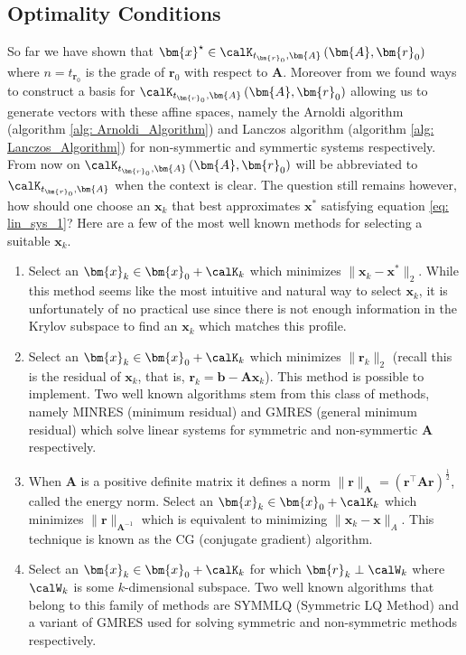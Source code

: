 \subsection{Optimality Conditions}\label{Section4.4}

So far we have shown that $\bm{x}^{\star} \in \calK_{t_{\bm{r}_0}, \bm{A}} \left( \bm{A}, \bm{r}_0 \right)$ where $n = t_{\bm{r}_0}$ is the grade of $\bm{r}_0$ with respect to $\bm{A}$. Moreover from  we found ways to construct a basis for $\calK_{t_{\bm{r}_0}, \bm{A}} \left( \bm{A}, \bm{r}_0 \right)$ allowing us to generate vectors with these affine spaces, namely the Arnoldi algorithm (algorithm \ref{alg: Arnoldi_Algorithm}) and Lanczos algorithm (algorithm \ref{alg: Lanczos_Algorithm}) for non-symmertic and symmertic systems respectively. From now on $\calK_{t_{\bm{r}_0}, \bm{A}} \left( \bm{A}, \bm{r}_0 \right)$ will be abbreviated to $\calK_{t_{\bm{r}_0}, \bm{A}}$ when the context is clear. The question still remains however, how should one choose an $\bm{x}_k$ that best approximates $\bm{x}^{\ast}$ satisfying equation \ref{eq: lin_sys_1}? Here are a few of the most well known methods for selecting a suitable $\bm{x}_k$.

\begin{enumerate}

    \item Select an $\bm{x}_k \in \bm{x}_0 + \calK_k$ which minimizes $\| \bm{x}_k - \bm{x}^{\ast} \|_2$. While this method seems like the most intuitive and natural way to select $\bm{x}_k$, it is unfortunately of no practical use since there is not enough information in the Krylov subspace to find an $\bm{x}_k$ which matches this profile.

    \item Select an $\bm{x}_k \in \bm{x}_0 + \calK_k$ which minimizes $\| \bm{r}_k \|_2$ (recall this is the residual of $\bm{x}_k$, that is, $\bm{r}_k = \bm{b} - \bm{A} \bm{x}_k$). This method is possible to implement. Two well known algorithms stem from this class of methods, namely MINRES (minimum residual) and GMRES (general minimum residual) which solve linear systems for symmetric and non-symmertic $\bm{A}$ respectively.

    \item When $\bm{A}$ is a positive definite matrix it defines a norm $\| \bm{r} \|_{\bm{A}} = \left( \bm{r}^{\intercal} \bm{A} \bm{r} \right)^{\frac{1}{2}}$, called the energy norm. Select an $\bm{x}_k \in \bm{x}_0 + \calK_k$ which minimizes $\| \bm{r} \|_{\bm{A}^{-1}}$ which is equivalent to minimizing $\| \bm{x}_k - \bm{x} \|_{A}$. This technique is known as the CG (conjugate gradient) algorithm.

    \item Select an $\bm{x}_k \in \bm{x}_0 + \calK_k$ for which $\bm{r}_{k} \perp \calW_k$ where $\calW_k$ is some $k$-dimensional subspace. Two well known algorithms that belong to this family of methods are SYMMLQ (Symmetric LQ Method) and a variant of GMRES used for solving symmetric and non-symmetric methods respectively.

\end{enumerate}

